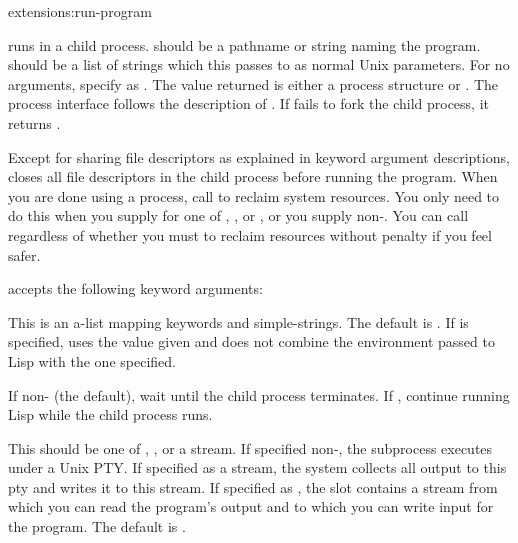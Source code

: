 \begin{defun}{extensions:}{run-program}{%
    }
     
   runs  in a child process.
   should be a pathname or string naming the program.
   should be a list of strings which this passes to
   as normal Unix parameters.  For no arguments, specify
   as \nil.  The value returned is either a process
  structure or \nil.  The process interface follows the description of
  .  If  fails to fork the child
  process, it returns \nil.
  
  Except for sharing file descriptors as explained in keyword argument
  descriptions,  closes all file descriptors in the
  child process before running the program.  When you are done using a
  process, call  to reclaim system resources.  You
  only need to do this when you supply  for one of
  , , or , or you supply 
  non-\nil.  You can call  regardless of whether
  you must to reclaim resources without penalty if you feel safer.

   accepts the following keyword arguments:

  \begin{Lentry}   
  \item[\kwd{env}] This is an a-list mapping keywords and
    simple-strings.  The default is .  If
     is specified,  uses the value given
    and does not combine the environment passed to Lisp with the one
    specified.
    
  \item[\kwd{wait}] If non-\nil{} (the default), wait until the child
    process terminates.  If \nil, continue running Lisp while the
    child process runs.
    
  \item[\kwd{pty}] This should be one of \true, \nil, or a stream.  If
    specified non-\nil, the subprocess executes under a Unix PTY.
    If specified as a stream, the system collects all output to this
    pty and writes it to this stream.  If specified as \true, the
     slot contains a stream from which you can read
    the program's output and to which you can write input for the
    program.  The default is \nil.
    

\end{Lentry}
\end{defun}
